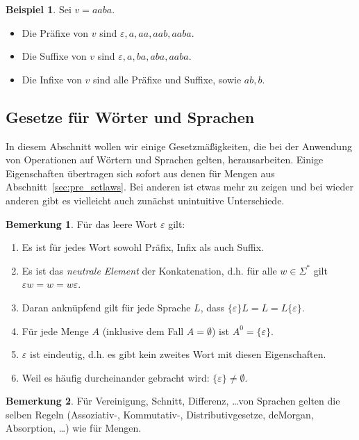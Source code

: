 \documentclass[11pt, a4paper]{article}
\theoremstyle{definition}
\newtheorem{example}[definition]{Beispiel}
\newtheorem*{remark*}{Bemerkung}
\theoremstyle{plain}
\numberwithin{equation}{section}
\begin{document}
\begin{example}
	Sei \( v = aaba \).
	\begin{itemize}
		\item Die Präfixe von \( v \) sind \( \varepsilon, a, aa, aab, aaba \).
		\item Die Suffixe von \( v \) sind \( \varepsilon, a, ba, aba, aaba \).
		\item Die Infixe von \( v \) sind alle Präfixe und Suffixe, sowie \( ab, b \).
	\end{itemize}
\end{example}


\subsection{Gesetze für Wörter und Sprachen}\label{sec:awl_wordlaws}
In diesem Abschnitt wollen wir einige Gesetzmäßigkeiten, die bei der Anwendung von Operationen auf Wörtern und Sprachen gelten, herausarbeiten. Einige Eigenschaften übertragen sich sofort aus denen für Mengen aus Abschnitt~\ref{sec:pre_setlaws}. Bei anderen ist etwas mehr zu zeigen und bei wieder anderen gibt es vielleicht auch zunächst unintuitive Unterschiede.
\begin{remark*}
	Für das leere Wort \( \varepsilon \) gilt:
	\begin{enumerate}
		\item Es ist für jedes Wort sowohl Präfix, Infix als auch Suffix.
		\item Es ist das \textit{neutrale Element} der Konkatenation, d.h. für alle \( w \in \Sigma^\ast \) gilt \( \varepsilon w = w = w \varepsilon \).
		\item Daran anknüpfend gilt für jede Sprache \( L \), dass \(  \{ \varepsilon \} L = L = L  \{ \varepsilon \} \).
		\item Für jede Menge \( A \) (inklusive dem Fall \( A = \emptyset \)) ist \( A^0 = \{ \varepsilon \} \).
		\item \( \varepsilon \) ist eindeutig, d.h. es gibt kein zweites Wort mit diesen Eigenschaften.
		\item Weil es häufig durcheinander gebracht wird: \( \{ \varepsilon \} \neq \emptyset \).
	\end{enumerate}
\end{remark*}

\begin{remark*}
	Für Vereinigung, Schnitt, Differenz, \ldots von Sprachen gelten die selben Regeln (Assoziativ-, Kommutativ-, Distributivgesetze, deMorgan, Absorption, \ldots) wie für Mengen.
\end{remark*}
\end{document}
